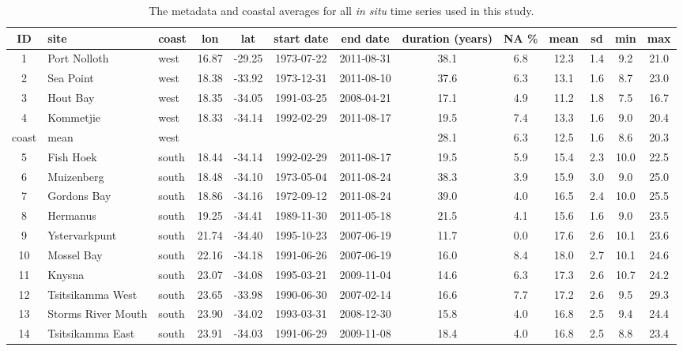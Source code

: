 \documentclass[a4paper,10pt,review]{elsarticle}
\begin{document}
\begin{table}[]
\caption{\small The metadata and coastal averages for all \emph{in situ} time series used in this study.}
\label{tableS1}
\centering
\tiny
\begin{tabular}{cllcccccccccc}
  \hline
 ID & site & coast & lon & lat & start date & end date & duration (years) & NA \% & mean & sd & min & max \\ 
  \hline
1 & Port Nolloth & west & 16.87 & -29.25 & 1973-07-22 & 2011-08-31 & 38.1 & 6.8 & 12.3 & 1.4 & 9.2 & 21.0 \\ 
2 & Sea Point & west & 18.38 & -33.92 & 1973-12-31 & 2011-08-10 & 37.6 & 6.3 & 13.1 & 1.6 & 8.7 & 23.0 \\ 
3 & Hout Bay & west & 18.35 & -34.05 & 1991-03-25 & 2008-04-21 & 17.1 & 4.9 & 11.2 & 1.8 & 7.5 & 16.7 \\ 
4 & Kommetjie & west & 18.33 & -34.14 & 1992-02-29 & 2011-08-17 & 19.5 & 7.4 & 13.3 & 1.6 & 9.0 & 20.4 \\ 
coast & mean & west &  &  &  &  & 28.1 & 6.3 & 12.5 & 1.6 & 8.6 & 20.3 \\ 
5 & Fish Hoek & south & 18.44 & -34.14 & 1992-02-29 & 2011-08-17 & 19.5 & 5.9 & 15.4 & 2.3 & 10.0 & 22.5 \\ 
6 & Muizenberg & south & 18.48 & -34.10 & 1973-05-04 & 2011-08-24 & 38.3 & 3.9 & 15.9 & 3.0 & 9.0 & 25.0 \\ 
7 & Gordons Bay & south & 18.86 & -34.16 & 1972-09-12 & 2011-08-24 & 39.0 & 4.0 & 16.5 & 2.4 & 10.0 & 25.5 \\ 
8 & Hermanus & south & 19.25 & -34.41 & 1989-11-30 & 2011-05-18 & 21.5 & 4.1 & 15.6 & 1.6 & 9.0 & 23.5 \\ 
9 & Ystervarkpunt & south & 21.74 & -34.40 & 1995-10-23 & 2007-06-19 & 11.7 & 0.0 & 17.6 & 2.6 & 10.1 & 23.6 \\ 
10 & Mossel Bay & south & 22.16 & -34.18 & 1991-06-26 & 2007-06-19 & 16.0 & 8.4 & 18.0 & 2.7 & 10.1 & 24.6 \\ 
11 & Knysna & south & 23.07 & -34.08 & 1995-03-21 & 2009-11-04 & 14.6 & 6.3 & 17.3 & 2.6 & 10.7 & 24.2 \\ 
12 & Tsitsikamma West & south & 23.65 & -33.98 & 1990-06-30 & 2007-02-14 & 16.6 & 7.7 & 17.2 & 2.6 & 9.5 & 29.3 \\ 
13 & Storms River Mouth & south & 23.90 & -34.02 & 1993-03-31 & 2008-12-30 & 15.8 & 4.0 & 16.8 & 2.5 & 9.4 & 24.4 \\ 
14 & Tsitsikamma East & south & 23.91 & -34.03 & 1991-06-29 & 2009-11-08 & 18.4 & 4.0 & 16.8 & 2.5 & 8.8 & 23.4 \\ 

\end{tabular}
\end{table}
\end{document}
